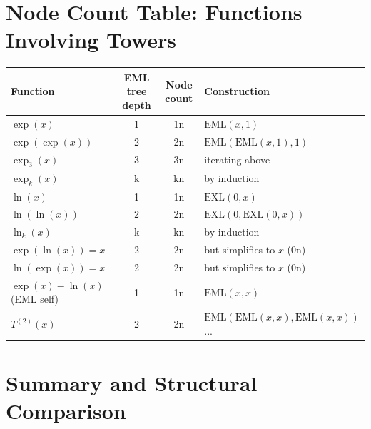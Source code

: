 \documentclass[11pt]{article}
\begin{document}
\section{Node Count Table: Functions Involving Towers}
\label{sec:table}

\begin{center}
\begin{tabular}{lccp{5cm}}
\toprule
Function & EML tree depth & Node count & Construction \\
\midrule
$\exp(x)$        & 1 & 1n & $\mathrm{EML}(x,1)$ \\
$\exp(\exp(x))$  & 2 & 2n & $\mathrm{EML}(\mathrm{EML}(x,1),1)$ \\
$\exp_3(x)$      & 3 & 3n & iterating above \\
$\exp_k(x)$      & k & kn & by induction \\
$\ln(x)$         & 1 & 1n & $\mathrm{EXL}(0,x)$ \\
$\ln(\ln(x))$    & 2 & 2n & $\mathrm{EXL}(0,\mathrm{EXL}(0,x))$ \\
$\ln_k(x)$       & k & kn & by induction \\
$\exp(\ln(x))=x$ & 2 & 2n & but simplifies to $x$ (0n) \\
$\ln(\exp(x))=x$ & 2 & 2n & but simplifies to $x$ (0n) \\
$\exp(x)-\ln(x)$ (EML self) & 1 & 1n & $\mathrm{EML}(x,x)$ \\
$T^{(2)}(x)$     & 2 & 2n & $\mathrm{EML}(\mathrm{EML}(x,x),\mathrm{EML}(x,x))$... \\
\bottomrule
\end{tabular}
\end{center}

\section{Summary and Structural Comparison}
\label{sec:summary}
\end{document}
